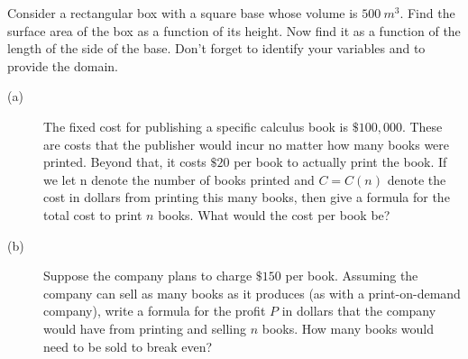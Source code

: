 \begin{ProblemSection}
  \begin{myproblem}{}
    Consider a rectangular box with a square base whose volume is
    $500~ m^3.$ Find the surface area of the box as a function of its
    height.  Now find it as a function of the length of the side of
    the base.  Don't forget to identify your variables and to provide
    the domain.
  \end{myproblem}
  \begin{myproblem}{}
    \begin{description}
    \item[(a)] The fixed cost for publishing a specific calculus book
      is $\$100,000.$ These are costs that the publisher would incur
      no matter how many books were printed.  Beyond that, it costs
      $\$20$ per book to actually print the book.  If we let n denote
      the number of books printed and $C=C(n)$ denote the cost in
      dollars from printing this many books, then give a formula for
      the total cost to print $n$ books.  What would the cost per book
      be?
    \item[(b)] Suppose the company plans to charge $\$150$ per book.
      Assuming the company can sell as many books as it produces (as
      with a print-on-demand company), write a formula for the profit
      $P$ in dollars that the company would have from printing and
      selling $n$ books.  How many books would need to be sold to
      break even?
    \end{description}
  \end{myproblem}
\end{ProblemSection}



